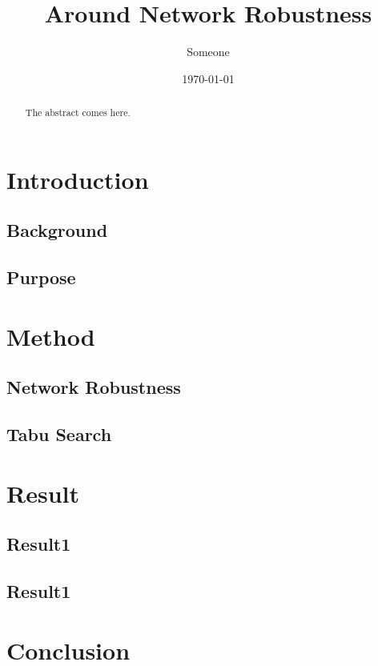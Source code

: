 \documentclass{report}
\begin{document}
\title{Around Network Robustness}
\date{\today}
\author{Someone}

\maketitle
\begin{abstract}
The abstract comes here.
\end{abstract}
\tableofcontents

\chapter{Introduction}
\section{Background}
\section{Purpose}

\chapter{Method}
\section{Network Robustness}
\section{Tabu Search}

\chapter{Result}
\section{Result1}
\section{Result1}

\chapter{Conclusion}



\end{document}
